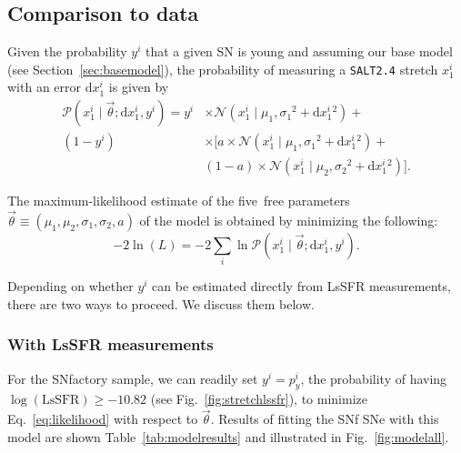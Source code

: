 \documentclass[]{aa}
\newcommand{\prob}[2]{\mathcal{P}\left( #1 \mid #2\right)}
\begin{document}
\subsection{Comparison to data}\label{sec:basemodelapplied}

Given the probability $y^i$ that a given SN is young and assuming our base
model (see Section~\ref{sec:basemodel}), the probability of measuring a
\textsc{\texttt{SALT2.4}} stretch $x_1^i$ with an error d$x_1^i$ is given by
\begin{align}\label{eq:likelihoodsnf}
    \prob{x^i_1}{\vec{\theta}; \mathrm{d}x^i_1, y^i} =
    y^i & \times
    \mathcal{N}\left(x^i_1 \mid \mu_1, \sigma_1{}^2+\mathrm{d}x^i_1{}^2\right) +
    \nonumber\\
    (1-y^i) &\times \bigg[
    a \times \mathcal{N}\left(x^i_1 \mid \mu_1,
    \sigma_1{}^2+\mathrm{d}x^i_1{}^2\right) +
    \nonumber\\
    & (1-a) \times \mathcal{N}\left(x^i_1 \mid \mu_2,
    \sigma_2{}^{2}+\mathrm{d}x^i_1{}^2\right) \bigg].
\end{align}

The maximum-likelihood estimate of the five~free parameters
$\vec{\theta}\equiv({\mu_1,\mu_2,\sigma_1,\sigma_2,a})$ of the model is obtained
by minimizing the following:
\begin{equation}\label{eq:likelihood}
    -2\ln(L) = -2 \sum_i \ln \prob{x_1^i}{\vec{\theta};
    \mathrm{d}x_1^i, y^i}.
\end{equation}

Depending on whether $y^i$ can be estimated directly from LsSFR measurements, there are two ways to proceed. We discuss them below.

\subsubsection{With LsSFR measurements}\label{sec:modelpy}

For the SNfactory sample, we can readily set $y^i = p^i_y$, the probability of
having $\log(\textrm{LsSFR}) \geq -10.82$ (see Fig.~\ref{fig:stretchlssfr}), to
minimize Eq.~\ref{eq:likelihood} with respect to $\vec{\theta}$. Results of
fitting the SNf SNe with this model are shown Table~\ref{tab:modelresults} and
illustrated in Fig.~\ref{fig:modelall}.
\end{document}
